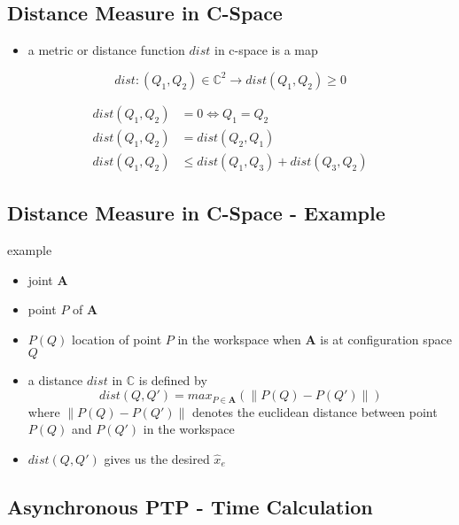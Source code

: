 \documentclass[%
  professionalfonts,%
  xcolor={%
    usenames,%
    dvipsnames,%
    svgnames,%
    table,%
    hyperref%
  }%
]{beamer}
\begin{document}
\subsection{Distance Measure in C-Space}
\begin{frame}
	
\begin{itemize}
	\item a metric or distance function $dist$ in c-space is a map
\end{itemize}

\begin{equation*}
dist: (Q_1,Q_2) \in \mathbb{C}^2 \longrightarrow dist(Q_1,Q_2) \geq 0
\end{equation*}

\begin{align*}
dist(Q_1,Q_2) & = 0 \iff Q_1 = Q_2 \\
dist(Q_1,Q_2) & = dist(Q_2,Q_1) \\
dist(Q_1,Q_2) & \leq dist(Q_1,Q_3) + dist(Q_3,Q_2)
\end{align*}

\end{frame}

\subsection{Distance Measure in C-Space - Example}
\begin{frame}
example
\begin{itemize}
\item joint $\mathbf{A}$
\item point $P$ of $\mathbf{A}$
\item $P(Q)$ location of point $P$ in the workspace when $\mathbf{A}$ is at configuration space $Q$
\item a distance $dist$ in $\mathbb{C}$ is defined by \begin{equation*}
dist(Q,Q') = max_{P \in \mathbf{A}} ( \lVert P(Q) - P(Q') \rVert )
\end{equation*}
where $\lVert P(Q) - P(Q') \rVert$ denotes the euclidean distance between point $P(Q)$ and $P(Q')$ in the workspace
\item $dist(Q,Q')$ gives us the desired $\hat{x}_{e}$
\end{itemize}
\end{frame}

\subsection{Asynchronous PTP - Time Calculation}
\end{document}
